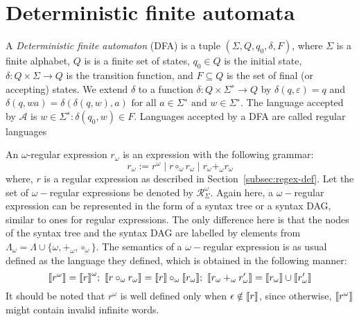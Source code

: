 \section{Deterministic finite automata}
A \emph{Deterministic finite automaton} (DFA) is a tuple $(\Sigma, Q, q_0, \delta, F)$, where $\Sigma$ is a finite alphabet, $Q$ is is a finite set of states, $q_0 \in Q$ is the initial state, $\delta : Q\times \Sigma \rightarrow Q$ is the transition function,
and $F \subseteq Q$ is the set of final (or accepting) states. We extend $\delta$ to a function $\delta : Q \times \Sigma^∗ \rightarrow Q$ by
$\delta(q, \varepsilon) = q$ and $\delta(q, wa) = \delta(\delta(q, w), a) \text{ for all } a \in \Sigma^∗\text{ and }w \in \Sigma^∗$. The language accepted by $\mathcal{A}$ is ${w \in \Sigma^∗: \delta(q_0, w) \in F}$. Languages accepted by a DFA are called regular languages



An $\omega$-regular expression $r_\omega$ is an expression with the following grammar:
\begin{equation*}
    r_\omega:=r^\omega \mid r\circ_\omega r_\omega \mid r_\omega+_\omega r_\omega
\end{equation*}
where, $r$ is a regular expression as described in Section~\ref{subsec:regex-def}. Let the set of $\omega-$regular expressions be denoted by $\mathcal{R}_{\Sigma}^{\omega}$.
Again here, a $\omega-$regular expression can be represented in the form of a syntax tree or a syntax DAG, similar to ones for regular expressions. The only difference here is that the nodes of the syntax tree and the syntax DAG are labelled by elements from $\Lambda_\omega=\Lambda\cup\{\omega, +_\omega, \circ_\omega\}$.  The semantics of a $\omega-$regular expression is as usual defined as the language they defined, which is obtained in the following manner:
\begin{equation*}
    \sema{r^\omega}=\sema{r}^\omega;\ \sema{r\circ_\omega r_\omega}=\sema{r}\circ_\omega\sema{r_{\omega}};\ \sema{r_\omega+_{\omega}r_\omega^{\prime}}=\sema{r_\omega}\cup \sema{r_\omega^{\prime}}
\end{equation*}
It should be noted that $r^\omega$ is well defined only when $\epsilon\notin {\llbracket}r{\rrbracket}$, since otherwise, ${\llbracket}r^\omega{\rrbracket}$ might contain invalid infinite words.